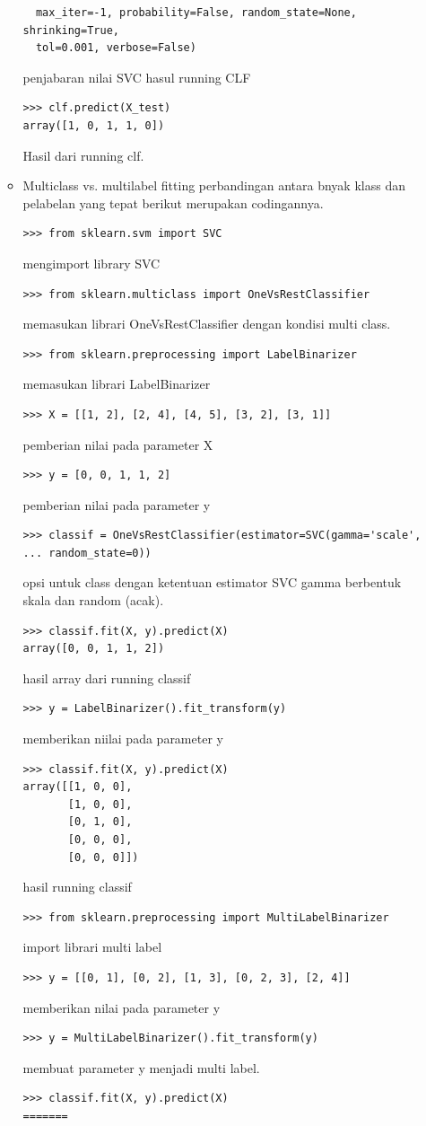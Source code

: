 \begin{enumerate}
\begin{itemize}
\begin{verbatim}
  max_iter=-1, probability=False, random_state=None, shrinking=True,
  tol=0.001, verbose=False)
\end{verbatim}
penjabaran nilai SVC hasul running CLF
\begin{verbatim}
>>> clf.predict(X_test)
array([1, 0, 1, 1, 0])
\end{verbatim}
Hasil dari  running clf.
\item
Multiclass vs. multilabel fitting
perbandingan antara bnyak klass dan pelabelan yang tepat berikut merupakan codingannya.
\begin{verbatim}
>>> from sklearn.svm import SVC
\end{verbatim}
mengimport library SVC
\begin{verbatim}
>>> from sklearn.multiclass import OneVsRestClassifier
\end{verbatim}
memasukan librari OneVsRestClassifier dengan kondisi multi class.
\begin{verbatim} 
>>> from sklearn.preprocessing import LabelBinarizer
\end{verbatim}
memasukan librari  LabelBinarizer
\begin{verbatim}
>>> X = [[1, 2], [2, 4], [4, 5], [3, 2], [3, 1]]
\end{verbatim}
pemberian nilai pada parameter X
\begin{verbatim}
>>> y = [0, 0, 1, 1, 2]
\end{verbatim}
pemberian nilai pada parameter y
\begin{verbatim}
>>> classif = OneVsRestClassifier(estimator=SVC(gamma='scale',
... random_state=0))
\end{verbatim}
opsi untuk class dengan ketentuan estimator SVC gamma berbentuk skala dan random (acak).
\begin{verbatim}
>>> classif.fit(X, y).predict(X)
array([0, 0, 1, 1, 2])
\end{verbatim}
hasil array dari running classif
\begin{verbatim}
>>> y = LabelBinarizer().fit_transform(y)
\end{verbatim}
memberikan niilai pada parameter y
\begin{verbatim}
>>> classif.fit(X, y).predict(X)
array([[1, 0, 0],
       [1, 0, 0],
       [0, 1, 0],
       [0, 0, 0],
       [0, 0, 0]])
\end{verbatim}
hasil running classif 
\begin{verbatim}
>>> from sklearn.preprocessing import MultiLabelBinarizer
\end{verbatim}
import librari multi label
\begin{verbatim}
>>> y = [[0, 1], [0, 2], [1, 3], [0, 2, 3], [2, 4]]
\end{verbatim}
memberikan nilai pada parameter y
\begin{verbatim}
>>> y = MultiLabelBinarizer().fit_transform(y)
\end{verbatim}
membuat parameter y menjadi multi label.
\begin{verbatim}
>>> classif.fit(X, y).predict(X)
=======


\end{verbatim}
\end{itemize}
\end{enumerate}
